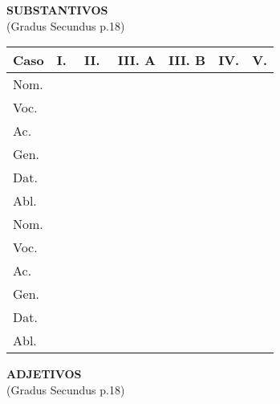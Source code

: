\documentclass[12pt, oneside, a4paper, article]{article}
\begin{document}
\begin{landscape}

\begin{table}
\centering
\textbf{SUBSTANTIVOS}  \\ (Gradus Secundus p.18)
\vspace{1 ex}

\begin{tabular}[!ht]
{|l|p{1.25cm}|p{1.75cm}|p{1.6cm}|p{1.6cm}|p{1.6cm}|p{1.6cm}|p{1.6cm}|p{1.6cm}|p{1.6cm}|p{1.6cm}|p{1.6cm}|p{1.6cm}|p{1.25cm}|} 
\hline \hline
Caso & \multicolumn{1}{c|}{I.} & \multicolumn{3}{c|}{II.} & \multicolumn{3}{c|}{III. A} & \multicolumn{3}{c|}{III. B}& \multicolumn{2}{c|}{IV.} & \multicolumn{1}{c|}{V.} 
\\
\hline
Nom. & & & & & & & & & & & & & \\ \hline
Voc. & & & & & & & & & & & & & \\ \hline
Ac.  & & & & & & & & & & & & & \\ \hline
Gen. & & & & & & & & & & & & & \\ \hline
Dat. & & & & & & & & & & & & & \\ \hline
Abl. & & & & & & & & & & & & & \\ 
\hline \hline                        
Nom. & & & & & & & & & & & & & \\ \hline
Voc. & & & & & & & & & & & & & \\ \hline
Ac.  & & & & & & & & & & & & & \\ \hline
Gen. & & & & & & & & & & & & & \\ \hline
Dat. & & & & & & & & & & & & & \\ \hline
Abl. & & & & & & & & & & & & & \\ 
\hline \hline
\end{tabular}
\end{table}


\begin{table}
\centering
\textbf{ADJETIVOS} \\ (Gradus Secundus p.18)
\vspace{1 ex}


\end{table}
\end{landscape}
\end{document}
